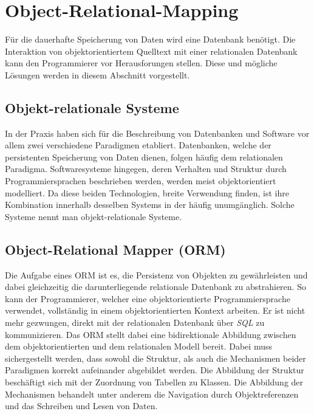 \section{Object-Relational-Mapping}

Für die dauerhafte Speicherung von Daten wird eine Datenbank benötigt. Die Interaktion von objektorientiertem Quelltext mit einer relationalen Datenbank kann den Programmierer vor Herausforungen stellen. Diese und mögliche Lösungen werden in diesem Abschnitt vorgestellt.

\subsection{Objekt-relationale Systeme}
In der Praxis haben sich für die Beschreibung von Datenbanken und Software vor allem zwei verschiedene Paradigmen etabliert. Datenbanken, welche der persistenten Speicherung von Daten dienen, folgen häufig dem relationalen Paradigma. Softwaresysteme hingegen, deren Verhalten und Struktur durch Programmiersprachen beschrieben werden, werden meist objektorientiert modelliert. Da diese beiden Technologien, breite Verwendung finden, ist ihre Kombination innerhalb desselben Systems in der häufig unumgänglich. Solche Systeme nennt man objekt-relationale Systeme. \cite{ireland_understanding_2009}

\subsection{Object-Relational Mapper (ORM)}
Die Aufgabe eines ORM ist es, die Persistenz von Objekten zu gewährleisten \cite{noauthor_what_2023} und dabei gleichzeitig die darunterliegende relationale Datenbank zu abstrahieren. So kann der Programmierer, welcher eine objektorientierte Programmiersprache verwendet, vollständig in einem objektorientierten Kontext arbeiten. Er ist nicht mehr gezwungen, direkt mit der relationalen Datenbank über \emph{SQL} zu kommunizieren. Das ORM stellt dabei eine bidirektionale Abbildung zwischen dem objektorientierten und dem relationalen Modell bereit. Dabei muss sichergestellt werden, dass sowohl die Struktur, als auch die Mechanismen beider Paradigmen korrekt aufeinander abgebildet werden. Die Abbildung der Struktur beschäftigt sich mit der Zuordnung von Tabellen zu Klassen. Die Abbildung der Mechanismen behandelt unter anderem die Navigation durch Objektreferenzen und das Schreiben und Lesen von Daten. \cite{ireland_understanding_2009}

